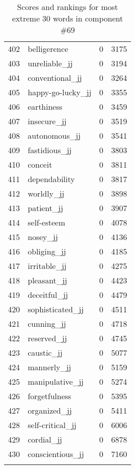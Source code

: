 \begin{longtable}[!htbp]{| rlr@{.}l |}
    402 & belligerence & 0 & 3175 \\
    403 & unreliable\_jj & 0 & 3194 \\
    404 & conventional\_jj & 0 & 3264 \\
    405 & happy-go-lucky\_jj & 0 & 3355 \\
    406 & earthiness & 0 & 3459 \\
    407 & insecure\_jj & 0 & 3519 \\
    408 & autonomous\_jj & 0 & 3541 \\
    409 & fastidious\_jj & 0 & 3803 \\
    410 & conceit & 0 & 3811 \\
    411 & dependability & 0 & 3817 \\
    412 & worldly\_jj & 0 & 3898 \\
    413 & patient\_jj & 0 & 3907 \\
    414 & self-esteem & 0 & 4078 \\
    415 & nosey\_jj & 0 & 4136 \\
    416 & obliging\_jj & 0 & 4185 \\
    417 & irritable\_jj & 0 & 4275 \\
    418 & pleasant\_jj & 0 & 4423 \\
    419 & deceitful\_jj & 0 & 4479 \\
    420 & sophisticated\_jj & 0 & 4511 \\
    421 & cunning\_jj & 0 & 4718 \\
    422 & reserved\_jj & 0 & 4745 \\
    423 & caustic\_jj & 0 & 5077 \\
    424 & mannerly\_jj & 0 & 5159 \\
    425 & manipulative\_jj & 0 & 5274 \\
    426 & forgetfulness & 0 & 5395 \\
    427 & organized\_jj & 0 & 5411 \\
    428 & self-critical\_jj & 0 & 6006 \\
    429 & cordial\_jj & 0 & 6878 \\
    430 & conscientious\_jj & 0 & 7160 \\
    \hline
    \caption{Scores and rankings for most extreme 30 words in component \#69} \\
\end{longtable}
